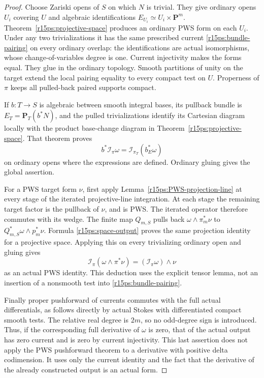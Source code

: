 \begin{proof}
Choose Zariski opens of $S$ on which $N$ is trivial.  They give
ordinary opens $U_i$ covering $U$ and algebraic identifications
$E_{U_i}\simeq U_i\times\mathbf P^m$.
Theorem~\ref{r15ps:projective-space} produces an ordinary PWS
form on each $U_i$.  Under any two trivializations it has the
same prescribed current \eqref{r15ps:bundle-pairing} on every
ordinary overlap: the identifications are actual isomorphisms,
whose change-of-variables degree is one.  Current injectivity
makes the forms equal.  They glue in the ordinary topology.
Smooth partitions of unity on the target extend the local
pairing equality to every compact test on $U$.  Properness of
$\pi$ keeps all pulled-back paired supports compact.

If $b:T\to S$ is algebraic between smooth integral bases, its
pullback bundle is $E_T=\mathbf P_T(b^*N)$, and the pulled
trivializations identify its Cartesian diagram locally with
the product base-change diagram in
Theorem~\ref{r15ps:projective-space}.  That theorem proves
\[
 b^*\mathcal I_\pi\omega
        =\mathcal I_{\pi_T}(b_E^*\omega)
\tag{PS15.10}\label{r15ps:bundle-base-change}
\]
on ordinary opens where the expressions are defined.  Ordinary
gluing gives the global assertion.

For a PWS target form $\nu$, first apply
Lemma~\ref{r15ps:PWS-projection-line} at every stage of the
iterated projective-line integration.  At each stage the
remaining target factor is the pullback of $\nu$, and is PWS.
The iterated operator therefore commutes with its wedge.
The finite map $Q_{m,S}$ pulls back
$\omega\wedge\pi_m^*\nu$ to
$Q_{m,S}^*\omega\wedge p_m^*\nu$.  Formula
\eqref{r15ps:space-output} proves the same projection identity
for a projective space.  Applying this on every trivializing
ordinary open and gluing gives
\[
 \mathcal I_\pi(\omega\wedge\pi^*\nu)
                           =(\mathcal I_\pi\omega)\wedge\nu
\tag{PS15.11}\label{r15ps:PWS-projection}
\]
as an actual PWS identity.  This deduction uses the explicit
tensor lemma, not an insertion of a nonsmooth test into
\eqref{r15ps:bundle-pairing}.

Finally proper pushforward of currents commutes with the full
actual differentials, as follows directly by actual Stokes
with differentiated compact smooth tests.  The relative real
degree is $2m$, so no odd-degree sign is introduced.  Thus, if
the corresponding full derivative of $\omega$ is zero, that
of the actual output has zero current and is zero by current
injectivity.  This last assertion does not apply the PWS
pushforward theorem to a derivative with positive delta
codimension.  It uses only the current identity and the fact
that the derivative of the already constructed output is an
actual form.
\end{proof}

